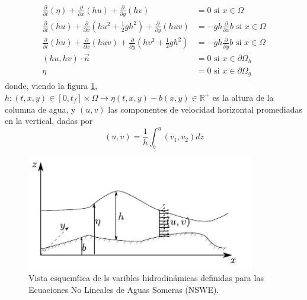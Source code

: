 \begin{align}  \begin{split}
\frac{\partial}{\partial t}\left(\eta\right)+\frac{\partial}{\partial x}\left(hu\right)+\frac{\partial}{\partial y}\left(hv\right) & =0  \text{       si } x \in \Omega\\
  \frac{\partial}{\partial t}\left(hu\right)+\frac{\partial}{\partial x}(hu^{2}+\frac{1}{2}gh^{2})+\frac{\partial}{\partial y}(huv) & =-gh\frac{\partial}{\partial x}b  \text{   si } x\in\Omega\\
  \frac{\partial}{\partial t}\left(hu\right)+\frac{\partial}{\partial x}(huv)+\frac{\partial}{\partial y}(hv^{2}+\frac{1}{2}gh^{2}) & =-gh\frac{\partial}{\partial y}b  \text{     si } x \in \Omega\\
  (hu,hv) \cdot \vec n &= 0  \text{ si    } x\in\partial \Omega_h \\
   \eta &= 0  \text{ si    } x \in \partial \Omega_g  
  \end{split}
  \label{eq:nswe_cart}
  \end{align}
donde, viendo la figura \ref{fig:vars}, $h:(t,x,y) \in [0,t_f] \times \Omega \to \eta(t,x,y)-b(x,y) \in \mathbb{R}^+$ es la altura de la columna de agua,  y $(u,v)$ las componentes de velocidad horizontal promediadas en la vertical, dadas por
 $$
  (u,v)=\frac{1}{h}\int_{b}^\eta (v_1,v_2)dz
 $$
  
  \begin{figure}
    \centering
    \includegraphics[width=10cm]{figs/variables.pdf}    
    \caption{ Vista esquem\'tica de ls varibles hidrodin\'amicas definidas para las Ecuaciones No Lineales de Aguas Someras (NSWE).}
    \label{fig:vars}
  \end{figure}

